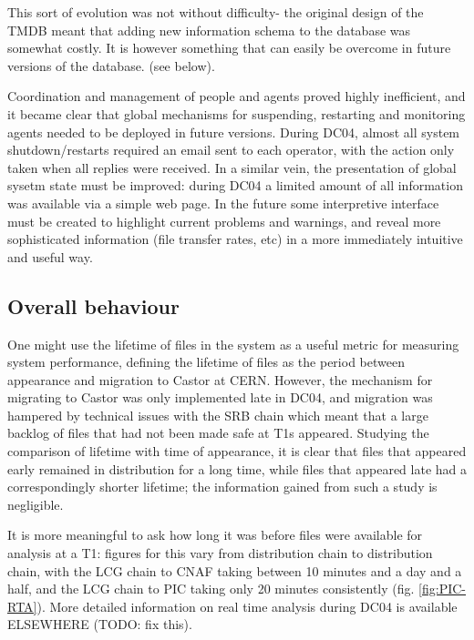 \documentclass{cmspaper}
\begin{document}
This sort of evolution was not without difficulty- the original design of the TMDB meant that adding new information schema to the database was somewhat costly. It is however something that can easily be overcome in future versions of the database. (see below).

Coordination and management of people and agents proved highly inefficient, and it became clear that global mechanisms for suspending, restarting and monitoring agents needed to be deployed in future versions. During DC04, almost all system shutdown/restarts required an email sent to each operator, with the action only taken when all replies were received. In a similar vein, the presentation of global sysetm state must be improved: during DC04 a limited amount of all information was available via a simple web page. In the future some interpretive interface must be created to highlight current problems and warnings, and reveal more sophisticated information (file transfer rates, etc) in a more immediately intuitive and useful way.

\subsection{Overall behaviour}
One might use the lifetime of files in the system as a useful metric for measuring system performance, defining the lifetime of files as the period between appearance and migration to Castor at CERN. However, the mechanism for migrating to Castor was only implemented late in DC04, and migration was hampered by technical issues with the SRB chain which meant that a large backlog of files that had not been made safe at T1s appeared. Studying the comparison of lifetime with time of appearance, it is clear that files that appeared early remained in distribution for a long time, while files that appeared late had a correspondingly shorter lifetime; the information gained from such a study is negligible.

It is more meaningful to ask how long it was before files were available for analysis at a T1: figures for this vary from distribution chain to distribution chain, with the LCG chain to CNAF taking between 10 minutes and a day and a half, and the LCG chain to PIC taking only 20 minutes consistently (fig. \ref{fig:PIC-RTA}). More detailed information on real time analysis during DC04 is available ELSEWHERE (TODO: fix this).
\end{document}
